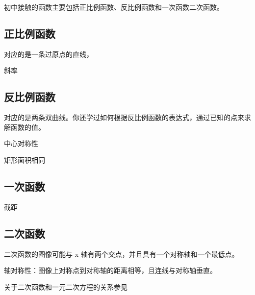 
\begin{issues}
\issueDraft
\end{issues}

初中接触的函数主要包括正比例函数、反比例函数和一次函数二次函数。

\subsection{正比例函数}

对应的是一条过原点的直线，

斜率


\subsection{反比例函数}

对应的是两条双曲线。你还学过如何根据反比例函数的表达式，通过已知的点来求解函数的值。

中心对称性

矩形面积相同


\subsection{一次函数}

截距

\subsection{二次函数}

二次函数的图像可能与  x  轴有两个交点，并且具有一个对称轴和一个最低点。

轴对称性：图像上对称点到对称轴的距离相等，且连线与对称轴垂直。

关于二次函数和一元二次方程的关系参见